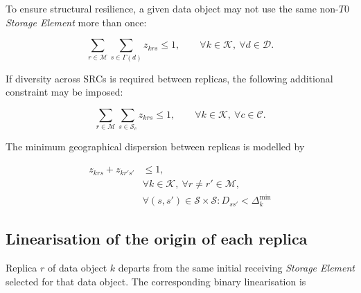 \documentclass[a4paper,fleqn]{cas-dc}
\newcommand{\Dset}{\mathcal{D}}
\newcommand{\Eset}{\mathcal{E}}
\newcommand{\Sset}{\mathcal{S}}
\newcommand{\Kset}{\mathcal{K}}
\newcommand{\Mset}{\mathcal{M}}
\newcommand{\Cset}{\mathcal{C}}
\begin{document}
To ensure structural resilience, a given data object may not use the same non-\(T0\) \emph{Storage Element} more than once:

\begin{equation}
\sum_{r\in\Mset}\sum_{s\in\Gamma(d)} z_{krs} \le 1,
\qquad \forall k\in\Kset,\ \forall d\in\Dset.
\end{equation}


If diversity across SRCs is required between replicas, the following additional constraint may be imposed:

\begin{equation}
\sum_{r\in\Mset}\sum_{s\in\Sset_c} z_{krs} \le 1,
\qquad \forall k\in\Kset,\ \forall c\in\Cset.
\end{equation}

The minimum geographical dispersion between replicas is modelled by

\begin{equation}
\begin{split}
z_{krs} + z_{kr's'} &\le 1, \\
&\forall k\in\Kset,\ \forall r\neq r'\in\Mset, \\
&\forall (s,s')\in\Sset\times\Sset : D_{ss'}<\Delta_k^{\min}
\end{split}
\end{equation}

\subsection*{Linearisation of the origin of each replica}

Replica \(r\) of data object \(k\) departs from the same initial receiving \emph{Storage Element} selected for that data object. The corresponding binary linearisation is

\end{document}
